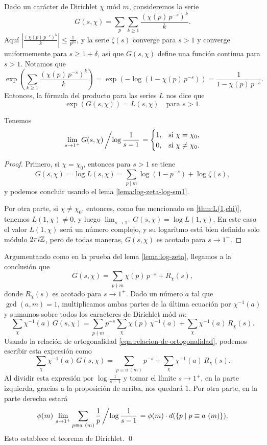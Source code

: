 Dado un carácter de Dirichlet $\chi$ mód $m$, consideremos la serie
$$G (s,\chi) = \sum_p \sum_{k\ge 1} \frac{(\chi (p)\,p^{-s})^k}{k}.$$
Aquí $\left|\frac{(\chi (p)\,p^{-s})^k}{k}\right| \le \frac{1}{p^{ks}}$,
y la serie $\zeta (s)$ converge para $s > 1$ y converge uniformemente para
$s \ge 1 + \delta$, así que $G (s,\chi)$ define una función continua para
$s > 1$. Notamos que
\[ \exp \left(\sum_{k\ge 1} \frac{(\chi (p)\,p^{-s})^k}{k}\right) =
\exp (-\log (1 - \chi (p)\,p^{-s})) = \frac{1}{1 - \chi(p)\,p^{-s}}. \]
Entonces, la fórmula del producto para las series $L$ nos dice que
$$\exp (G (s,\chi)) = L (s,\chi) \quad\text{para }s > 1.$$

\begin{proposicion}
  Tenemos
  \[ \lim_{s\to 1^+} G (s,\chi)\left/\log \frac{1}{s-1}\right. =
  \begin{cases}
    1, & \text{si } \chi = \chi_0, \\
    0, & \text{si } \chi \ne \chi_0.
  \end{cases} \]

  \begin{proof}
    Primero, si $\chi = \chi_0$, entonces para $s > 1$ se tiene
    \[ G (s,\chi) = \log L (s,\chi) =
    \sum_{p\mid m} \log (1 - p^{-s}) + \log \zeta (s), \]
    y podemos concluir usando el lema \ref{lema:log-zeta-log-sm1}.

    Por otra parte, si $\chi \ne \chi_0$, entonces, como fue mencionado en
    \ref{thm:L(1,chi)}, tenemos $L (1,\chi) \ne 0$, y luego
    $\lim_{s\to 1^+} G (s,\chi) = \log L (1,\chi)$. En este caso el valor
    $L (1,\chi)$ será un número complejo, y su logaritmo está bien definido solo
    módulo $2\pi i \mathbb{Z}$, pero de todas maneras, $G (s,\chi)$ es acotado para
    $s \to 1^+$.
  \end{proof}
\end{proposicion}

Argumentando como en la prueba del lema \ref{lema:log-zeta}, llegamos a la
conclusión que
$$G (s,\chi) = \sum_{p \nmid m} \chi (p)\,p^{-s} + R_\chi (s),$$
donde $R_\chi (s)$ es acotado para $s \to 1^+$. Dado un número $a$ tal que
$\gcd (a,m) = 1$, multiplicamos ambas partes de la última ecuación por
$\chi^{-1} (a)$ y sumamos sobre todos los caracteres de Dirichlet mód $m$:
$$\sum_\chi \chi^{-1} (a)\,G (s,\chi) = \sum_{p \nmid m} p^{-s} \sum_\chi \chi (p)\,\chi^{-1} (a) + \sum_\chi \chi^{-1} (a)\,R_\chi (s).$$
Usando la relación de ortogonalidad \eqref{eqn:relacion-de-ortogonalidad},
podemos escribir esta expresión como
$$\sum_\chi \chi^{-1} (a)\,G (s,\chi) = \sum_{p \equiv a ~ (m)} p^{-s} + \sum_\chi \chi^{-1} (a)\,R_\chi (s).$$
Al dividir esta expresión por $\log \frac{1}{s-1}$ y tomar el límite
$s \to 1^+$, en la parte izquierda, gracias a la proposición de arriba, nos
quedará $1$. Por otra parte, en la parte derecha estará
$$\phi (m)\,\lim_{s\to 1^+} \sum_{p \equiv a ~ (m)} \frac{1}{p} \left/\log \frac{1}{s-1}\right. = \phi (m) \cdot d (\{ p \mid p \equiv a ~ (m) \}).$$
Esto establece el teorema de Dirichlet. \qed


